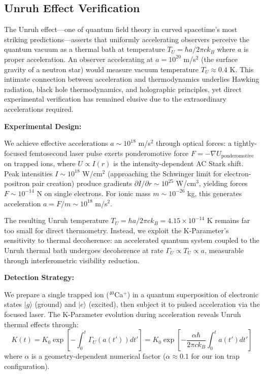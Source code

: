 \documentclass[11pt,a4paper,twoside]{article}
\begin{document}
\subsection{Unruh Effect Verification}

The Unruh effect---one of quantum field theory in curved spacetime's most striking predictions---asserts that uniformly accelerating observers perceive the quantum vacuum as a thermal bath at temperature $T_U = \hbar a / 2\pi c k_B$ where $a$ is proper acceleration. An observer accelerating at $a = 10^{20}$ m/s$^2$ (the surface gravity of a neutron star) would measure vacuum temperature $T_U \approx 0.4$ K. This intimate connection between acceleration and thermodynamics underlies Hawking radiation, black hole thermodynamics, and holographic principles, yet direct experimental verification has remained elusive due to the extraordinary accelerations required.

\textbf{Experimental Design:}

We achieve effective accelerations $a \sim 10^{18}$ m/s$^2$ through optical forces: a tightly-focused femtosecond laser pulse exerts ponderomotive force $F = -\nabla U_{\text{ponderomotive}}$ on trapped ions, where $U \propto I(r)$ is the intensity-dependent AC Stark shift. Peak intensities $I \sim 10^{18}$ W/cm$^2$ (approaching the Schwinger limit for electron-positron pair creation) produce gradients $\partial I/\partial r \sim 10^{25}$ W/cm$^3$, yielding forces $F \sim 10^{-14}$ N on single electrons. For ionic mass $m \sim 10^{-26}$ kg, this generates acceleration $a = F/m \sim 10^{18}$ m/s$^2$.

The resulting Unruh temperature $T_U = \hbar a / 2\pi c k_B = 4.15 \times 10^{-14}$ K remains far too small for direct thermometry. Instead, we exploit the K-Parameter's sensitivity to thermal decoherence: an accelerated quantum system coupled to the Unruh thermal bath undergoes decoherence at rate $\Gamma_U \propto T_U \propto a$, measurable through interferometric visibility reduction.

\textbf{Detection Strategy:}

We prepare a single trapped ion ($^{40}$Ca$^+$) in a quantum superposition of electronic states $|g\rangle$ (ground) and $|e\rangle$ (excited), then subject it to pulsed acceleration via the focused laser. The K-Parameter evolution during acceleration reveals Unruh thermal effects through:
\begin{equation}
K(t) = K_0 \exp\left[-\int_0^t \Gamma_U(a(t')) dt'\right] = K_0 \exp\left[-\frac{\alpha \hbar}{2\pi c k_B} \int_0^t a(t') dt'\right]
\end{equation}
where $\alpha$ is a geometry-dependent numerical factor ($\alpha \approx 0.1$ for our ion trap configuration).
\end{document}
